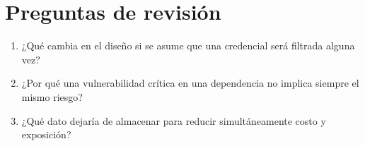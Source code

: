 \section{Preguntas de revisión}
\begin{enumerate}
  \item ¿Qué cambia en el diseño si se asume que una credencial será filtrada alguna vez?
  \item ¿Por qué una vulnerabilidad crítica en una dependencia no implica siempre el mismo riesgo?
  \item ¿Qué dato dejaría de almacenar para reducir simultáneamente costo y exposición?
\end{enumerate}
